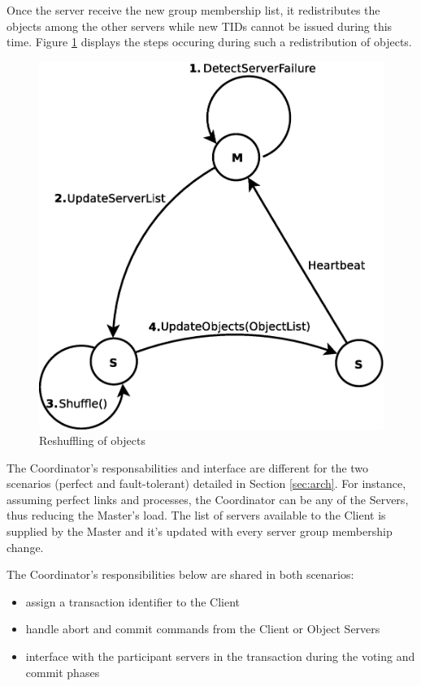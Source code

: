 \documentclass[times, 10pt,twocolumn]{article}
\begin{document}
Once the server receive the new group membership list, it redistributes the objects among the other servers while
 new TIDs cannot be issued during this time. Figure \ref{fig:resh} displays the steps occuring during such a
redistribution of objects.  
\begin{figure}
\centering
\includegraphics[scale=0.3]{reshuffle.eps}
\caption{Reshuffling of objects}
\label{fig:resh}
\end{figure}

\label{subsec:respon}
The Coordinator's responsabilities and interface are different for the two scenarios (perfect and fault-tolerant) detailed in Section \ref{sec:arch}. For instance, assuming perfect links and processes, the Coordinator can be any of the Servers, thus reducing the Master's load. The list of servers available to the Client is supplied by the Master and it's updated with every server group membership change.

The Coordinator's responsibilities below are shared in both scenarios:
\begin{itemize}[noitemsep,nolistsep]
\item assign a transaction identifier to the Client 
\item handle abort and commit commands from the Client or Object Servers 
\item interface with the participant servers in the transaction during the voting and commit phases 
\end{itemize}
\end{document}
